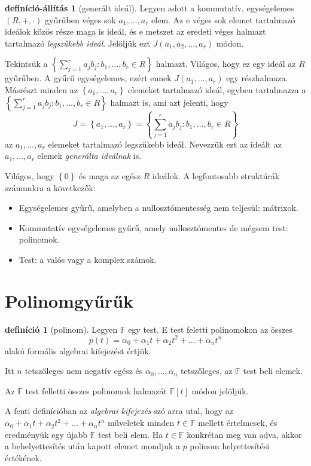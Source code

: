 \documentclass[9pt,showtrims]{memoir}
\theoremstyle{plain}
\theoremstyle{remark}
\theoremstyle{definition}
\newtheorem{definition}[proposition]{definíció}
\newtheorem{defprop}[proposition]{definíció-állítás}
\renewcommand{\mathbf}{\mathbb}
\begin{document}
\begin{defprop}[generált ideál]
    Legyen adott a  kommutatív, egységelemes $\left( R,+,\cdot \right)$ gyűrűben véges sok $a_1,\dots,a_r$ elem.
    Az e véges sok elemet tartalmazó ideálok közös része maga is ideál, 
    és e metszet az eredeti véges halmazt
    tartalmazó \emph{legszűkebb ideál}. 
    Jelöljük ezt $J\left( a_1,a_2,\dots,a_r \right)$ módon.

    Tekintsük a 
    $
\left\{ \sum_{j=1}^ra_jb_j:b_1,\dots,b_r\in R \right\}
    $ 
    halmazt.
    Világos, 
    hogy ez egy ideál az $R$ gyűrűben. 
    A gyűrű egységelemes, 
    ezért ennek $J\left( a_1,\dots,a_r \right)$ egy részhalmaza.
    Másrészt minden az $\left\{ a_1,\dots,a_r \right\}$ elemeket tartalmazó ideál, 
    egyben tartalmazza a
    $
    \left\{ \sum_{j=1}^ra_jb_j:b_1,\dots,b_r\in R \right\}
    $ 
    halmazt is,
    ami azt jelenti, hogy 
    \[
        J=\left\{ a_1,\dots,a_r \right\}=
        \left\{ \sum_{j=1}^ra_jb_j:b_1,\dots,b_r\in R \right\}
    \]
    az $a_1,\dots,a_r$ elemeket tartalmazó legszűkebb ideál.
    Nevezzük ezt az ideált az $a_1,\dots,a_r$ elemek \emph{generálta ideálnak} is.
\end{defprop}



Világos, hogy $\left\{ 0 \right\}$ és maga az egész $R$ ideálok.
A legfontosabb struktúrák számunkra a következők:
\begin{itemize}
    \item 
    Egységelemes gyűrű, amelyben a nullosztómentesség nem teljesül: mátrixok.
    \item
    Kommutatív egységelemes gyűrű, amely nullosztómentes de mégsem test: polinomok.
    \item
    Test:
    a valós vagy a komplex számok.
\end{itemize}
\section{Polinomgyűrűk}
\begin{definition}[polinom]
    Legyen $\mathbf{F}$ egy test.
    E test feletti polinomokon az összes 
    \[
        p\left( t \right)=
        \alpha_0+\alpha_1t+\alpha_2t^2+\dots+\alpha_nt^n
    \]
    alakú formális algebrai kifejezést értjük.

    Itt $n$ tetszőleges nem negatív egész 
    és $\alpha_0,\dots,\alpha_n$ tetszőleges, az $\mathbf{F}$ test beli elemek.

    Az $\mathbf{F}$ test felletti összes polinomok halmazát $\mathbf{F}\left[ t \right]$ módon jelöljük.
\end{definition}
A fenti definícióban az \emph{algebrai kifejezés} szó arra utal,  hogy az
\begin{math}
        \alpha_0+\alpha_1t+\alpha_2t^2+\dots+\alpha_nt^n
\end{math}
műveletek minden $t\in\mathbf{F}$ mellett értelmesek, 
és eredményük egy újabb $\mathbf{F}$ test beli elem.
Ha $t\in\mathbf{F}$ konkrétan meg van adva, 
akkor a behelyettesítés után kapott elemet mondjuk a $p$ polinom helyettesítési értékének.
\end{document}
